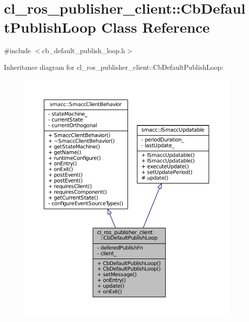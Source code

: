 \hypertarget{classcl__ros__publisher__client_1_1CbDefaultPublishLoop}{}\section{cl\+\_\+ros\+\_\+publisher\+\_\+client\+:\+:Cb\+Default\+Publish\+Loop Class Reference}
\label{classcl__ros__publisher__client_1_1CbDefaultPublishLoop}


{\ttfamily \#include $<$cb\+\_\+default\+\_\+publish\+\_\+loop.\+h$>$}



Inheritance diagram for cl\+\_\+ros\+\_\+publisher\+\_\+client\+:\+:Cb\+Default\+Publish\+Loop\+:
\nopagebreak
\begin{figure}[H]
\begin{center}
\leavevmode
\includegraphics[width=350pt]{classcl__ros__publisher__client_1_1CbDefaultPublishLoop__inherit__graph}
\end{center}
\end{figure}



